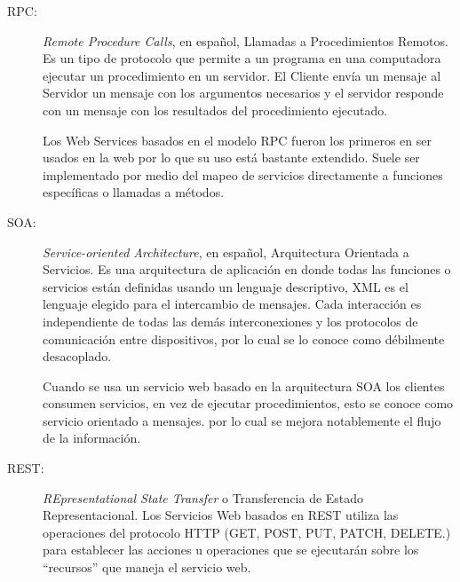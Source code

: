 \begin{description}
  \item[RPC:] \emph{Remote Procedure Calls}, en español, Llamadas a Procedimientos Remotos. Es un tipo de protocolo que permite a un programa en una computadora ejecutar un procedimiento en un servidor. El Cliente envía un mensaje al Servidor un mensaje con los argumentos necesarios y el servidor responde con un mensaje con los resultados del procedimiento ejecutado.

  Los Web Services basados en el modelo RPC fueron los primeros en ser usados en la web por lo que su uso está bastante extendido. Suele ser implementado por medio del mapeo de servicios directamente a funciones específicas o llamadas a métodos.


  \item[SOA:] \emph{Service-oriented Architecture}, en español, Arquitectura Orientada a Servicios.
Es una arquitectura de aplicación en donde todas las funciones o servicios están definidas usando un lenguaje descriptivo, XML es el lenguaje elegido para el intercambio de mensajes. Cada interacción es independiente de todas las demás interconexiones y los protocolos de comunicación entre dispositivos, por lo cual se lo conoce como débilmente desacoplado.

Cuando se usa un servicio web basado en la arquitectura SOA los clientes consumen servicios, en vez de ejecutar procedimientos, esto se conoce como servicio orientado a mensajes. por lo cual se mejora notablemente el flujo de la información.


  \item[REST:] \emph{REpresentational State Transfer} o Transferencia de Estado Representacional.
  Los Servicios Web basados en REST utiliza las operaciones del protocolo HTTP (GET, POST, PUT, PATCH, DELETE.) para establecer las acciones u operaciones que se ejecutarán sobre los ``recursos'' que maneja el servicio web.

\end{description}

